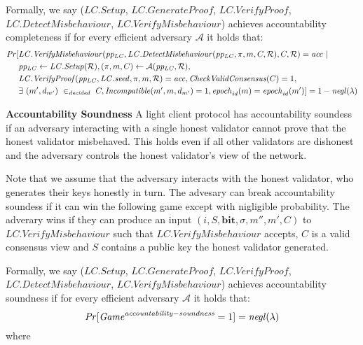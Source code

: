 Formally, we say ($\mathit{LC.Setup}$, $\mathit{LC.GenerateProof}$, 
$\mathit{LC.VerifyProof}$, \\ $\mathit{LC.DetectMisbehaviour}$, $\mathit{LC.VerifyMisbehaviour}$) 
achieves accountability completeness if for every efficient adversary $\mathcal{A}$ it holds that:
\begin{align*}
\mathit{Pr}[& \mathit{LC.VerifyMisbehaviour}(\mathit{pp_{\mathit{LC}}}, \mathit{LC.DetectMisbehaviour}(\mathit{pp_{\mathit{LC}}}, \pi, m, C, \mathcal{R}), C, \mathcal{R}) = \mathit{acc} \ | \ \\
& \mathit{pp_{\mathit{LC}}} \leftarrow \mathit{LC.Setup}( \mathcal{R}), (\pi, m, C) \leftarrow \mathcal{A}(\mathit{pp_{\mathit{LC}}}, \mathcal{R}), \\
& \mathit{LC.VerifyProof}(\mathit{pp_{\mathit{LC}}}, \mathit{LC.seed}, \pi, m, \mathcal{R}) = \mathit{acc}, \mathit{CheckValidConsensus}(C) =1, \\
& \exists \ (m', d_{m'}) \ \in_{\mathit{decided}} \ C, \mathit{Incompatible}(m', m, d_{m'})=1, \mathit{epoch}_{\mathit{id}}(m) = \mathit{epoch}_{\mathit{id}}(m')] = 1 - \mathit{negl}(\lambda)
\end{align*}

\noindent \textbf{Accountability Soundness} A light client protocol has accountability soundess if an adversary interacting with 
a single honest validator cannot prove that the honest validator misbehaved. This holds even if all other validators are dishonest and the adversary controls the honest validator's view of the network.

Note that we assume that the adversary interacts with the honest validator, who generates their keys honestly in turn. The advesary can break accountability soundess if it can win the following game except with nigligible probability. The adverary wins if they can produce an input $(i, S, \mathbf{bit}, \sigma, m'', m', C)$ to $\mathit{LC.VerifyMisbehaviour}$ such that $\mathit{LC.VerifyMisbehaviour}$ accepts, $C$ is a valid consensus view and $S$ contains a public key the honest validator generated.

Formally, we say ($\mathit{LC.Setup}$, $\mathit{LC.GenerateProof}$, 
$\mathit{LC.VerifyProof}$, \\ $\mathit{LC.DetectMisbehaviour}$, $\mathit{LC.VerifyMisbehaviour}$) 
achieves accountability soundness if for every efficient adversary $\mathcal{A}$ it holds that:
$$\mathit{Pr}[\mathit{Game}^{\mathit{accountability-soundness}}=1]=\mathit{negl}(\lambda)$$
where

